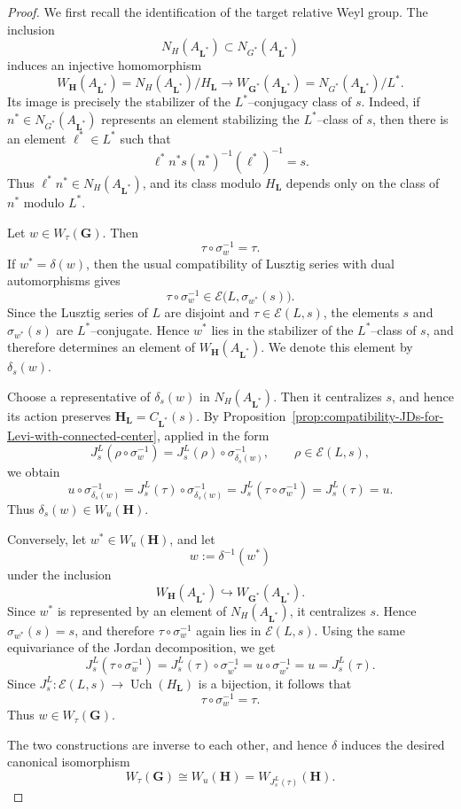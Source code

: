 \documentclass{amsart}
\theoremstyle{plain}
\numberwithin{equation}{section}
\theoremstyle{definition}
\newcommand{\Uch}{\operatorname{Uch}}
\newcommand{\bG}{\mathbf{G}}
\newcommand{\bL}{\mathbf{L}}
\newcommand{\bH}{\mathbf{H}}
\begin{document}
\begin{proof}
We first recall the identification of the target relative Weyl group.  The
inclusion
\[
N_H(A_{\bL^*})\subset N_{G^*}(A_{\bL^*})
\]
induces an injective homomorphism
\[
W_{\bH}(A_{\bL^*})
=
N_H(A_{\bL^*})/H_{\bL}
\longrightarrow
W_{\bG^*}(A_{\bL^*})
=
N_{G^*}(A_{\bL^*})/L^*.
\]
Its image is precisely the stabilizer of the $L^*$--conjugacy class of $s$.
Indeed, if $n^*\in N_{G^*}(A_{\bL^*})$ represents an element stabilizing the
$L^*$--class of $s$, then there is an element $\ell^*\in L^*$ such that
\[
\ell^* n^* s(n^*)^{-1}(\ell^*)^{-1}=s.
\]
Thus $\ell^* n^*\in N_H(A_{\bL^*})$, and its class modulo $H_{\bL}$ depends
only on the class of $n^*$ modulo $L^*$.

Let $w\in W_\tau(\bG)$.  Then
\[
\tau\circ\sigma_w^{-1}=\tau.
\]
If $w^*=\delta(w)$, then the usual compatibility of Lusztig series with dual
automorphisms gives
\[
\tau\circ\sigma_w^{-1}\in
\mathcal E\bigl(L,\sigma_{w^*}(s)\bigr).
\]
Since the Lusztig series of $L$ are disjoint and
$\tau\in\mathcal E(L,s)$, the elements $s$ and $\sigma_{w^*}(s)$ are
$L^*$--conjugate.  Hence $w^*$ lies in the stabilizer of the $L^*$--class of
$s$, and therefore determines an element of
$W_{\bH}(A_{\bL^*})$.  We denote this element by $\delta_s(w)$.

Choose a representative of $\delta_s(w)$ in $N_H(A_{\bL^*})$.  Then it
centralizes $s$, and hence its action preserves $\bH_{\bL}=C_{\bL^*}(s)$.
By Proposition~\ref{prop:compatibility-JDs-for-Levi-with-connected-center},
applied in the form
\[
J_s^L(\rho\circ\sigma_w^{-1})
=
J_s^L(\rho)\circ\sigma_{\delta_s(w)}^{-1},
\qquad
\rho\in\mathcal E(L,s),
\]
we obtain
\[
u\circ\sigma_{\delta_s(w)}^{-1}
=
J_s^L(\tau)\circ\sigma_{\delta_s(w)}^{-1}
=
J_s^L(\tau\circ\sigma_w^{-1})
=
J_s^L(\tau)
=
u.
\]
Thus $\delta_s(w)\in W_u(\bH)$.

Conversely, let $w^*\in W_u(\bH)$, and let
\[
w:=\delta^{-1}(w^*)
\]
under the inclusion
\[
W_{\bH}(A_{\bL^*})\hookrightarrow W_{\bG^*}(A_{\bL^*}).
\]
Since $w^*$ is represented by an element of $N_H(A_{\bL^*})$, it centralizes
$s$.  Hence $\sigma_{w^*}(s)=s$, and therefore
$\tau\circ\sigma_w^{-1}$ again lies in $\mathcal E(L,s)$.  Using the same
equivariance of the Jordan decomposition, we get
\[
J_s^L(\tau\circ\sigma_w^{-1})
=
J_s^L(\tau)\circ\sigma_{w^*}^{-1}
=
u\circ\sigma_{w^*}^{-1}
=
u
=
J_s^L(\tau).
\]
Since $J_s^L:\mathcal E(L,s)\to \Uch(H_{\bL})$ is a bijection, it follows that
\[
\tau\circ\sigma_w^{-1}=\tau.
\]
Thus $w\in W_\tau(\bG)$.

The two constructions are inverse to each other, and hence $\delta$ induces
the desired canonical isomorphism
\[
W_\tau(\bG)\cong W_u(\bH)
=
W_{J_s^L(\tau)}(\bH).
\]
\end{proof}
\end{document}
